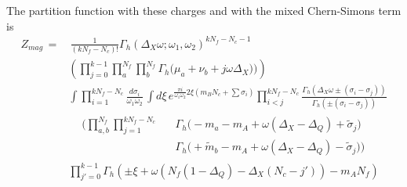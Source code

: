 The partition function with these charges and with the mixed Chern-Simons term is
\begin{equation}
\begin{aligned}
Z_{mag} %
\,= & \, \frac{1}{(k N_f - N_c)!}
 \Gamma_h ( \Delta_X \omega ; \omega_1 , \omega_2)^{ k N_f - N_c -1}  \\
 &  \left( \prod_{j=0}^{k-1}
\prod_a^{N_f } \prod_b^{N_f}  \Gamma_h \big( \mu_a+  \nu_b + j \omega \Delta_X) \big)  \right) \\
&\int  \prod_{i=1}^{ k N_f - N_c } \frac{d \sigma_i }{ \omega_1 \omega_2} \,\int
d \xi \, e^{ \frac{\pi i }{ \omega_1 \omega_2} 2 \xi  \left( m_B N_c + \sum \sigma_i \right)}  
\prod_{i<j}^{k N_f - N_c } \frac{ \Gamma_h( \Delta_X \omega \pm (\sigma_i - \sigma_j)) }{ \Gamma_h ( \pm (\sigma_i - \sigma_j) )}
	\\&
\begin{aligned}
	 &  \bigg( \prod_{a,b}^{N_f} \prod_{j=1}^{k N_f - N_c }
	 && \Gamma_h \big( - m_a - m_A + \omega (\Delta_X - \Delta_Q)  + \tilde{\sigma}_j \big) \\
 & && \Gamma_h \big(  + \tilde{m}_b - m_A + \omega (\Delta_X - \Delta_Q)  - \tilde{\sigma}_j \big)  \bigg)
	\end{aligned}
	\\
	& \prod_{j'=0}^{k-1} \Gamma_h \left( \pm {\xi} +\omega \left(
	N_f ( 1 - \Delta_Q ) - \Delta_X ( N_c - j')  \right) - m_A N_f
 \right)
\end{aligned}
\end{equation}












